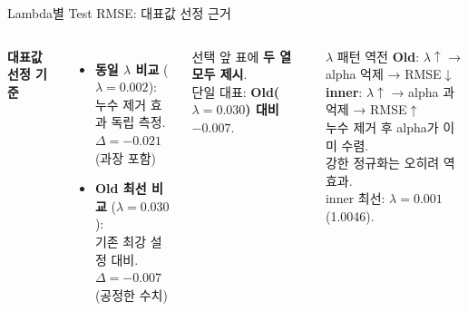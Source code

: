 \documentclass[aspectratio=169,10pt]{beamer}
\begin{document}
\begin{frame}[shrink=15]{Lambda별 Test RMSE: 대표값 선정 근거}
\begin{columns}[T]
			\textbf{대표값 선정 기준}
			\begin{itemize}
				\item \textbf{동일 $\lambda$ 비교} ($\lambda=0.002$):\\
					누수 제거 효과 독립 측정.\\
					$\Delta = -0.021$ (과장 포함)
				\item \textbf{Old 최선 비교} ($\lambda=0.030$):\\
					기존 최강 설정 대비.\\
					$\Delta = -0.007$ (공정한 수치)
			\end{itemize}

			\begin{block}{선택}
				앞 표에 \textbf{두 열 모두 제시}.\\
				단일 대표: \textbf{Old($\lambda=0.030$) 대비 $-0.007$}.
			\end{block}

			\begin{exampleblock}{$\lambda$ 패턴 역전}
				\textbf{Old}: $\lambda\uparrow$ → alpha 억제 → RMSE$\downarrow$\\
				\textbf{inner}: $\lambda\uparrow$ → alpha 과억제 → RMSE$\uparrow$\\
				\vspace{0.3em}
				누수 제거 후 alpha가 이미 수렴.\\
				강한 정규화는 오히려 역효과.\\
				inner 최선: $\lambda=0.001$ (1.0046).
			\end{exampleblock}
	\end{columns}
\end{frame}
\end{document}

